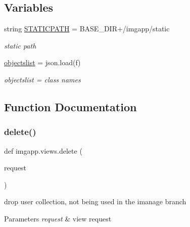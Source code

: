 \subsection*{Variables}
\begin{DoxyCompactItemize}
\item 
string \hyperlink{namespaceimgapp_1_1views_ae3b2640fa382262bdf30df5509438d83}{S\+T\+A\+T\+I\+C\+P\+A\+TH} = B\+A\+S\+E\+\_\+\+D\+IR+\textquotesingle{}/imgapp/static\textquotesingle{}
\begin{DoxyCompactList}\small\item\em static path \end{DoxyCompactList}\item 
\hyperlink{namespaceimgapp_1_1views_ace59bf1ee23e1e68ab25883a1ab83a07}{objectslist} = json.\+load(f)
\begin{DoxyCompactList}\small\item\em objectslist = class names \end{DoxyCompactList}\end{DoxyCompactItemize}


\subsection{Function Documentation}
\mbox{\label{namespaceimgapp_1_1views_ad231247785394cfcbefcf27970310f64}} 
\subsubsection{\texorpdfstring{delete()}{delete()}}
{\footnotesize\ttfamily def imgapp.\+views.\+delete (\begin{DoxyParamCaption}\item[{}]{request }\end{DoxyParamCaption})}



drop user collection, not being used in the imanage branch 


\begin{DoxyParams}{Parameters}
{\em request} & view request \\
\hline
\end{DoxyParams}
\mbox{\label{namespaceimgapp_1_1views_aad5f229f777ab6368cc67dab4436b8ac}} 
